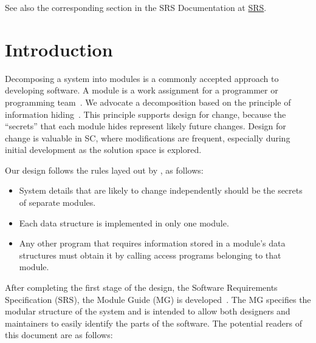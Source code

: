 \documentclass[12pt, titlepage]{article}
\begin{document}
See also the corresponding section in the SRS Documentation at 
\href{https://github.com/gabrielasd/eomee/tree/cas741/docs/SRS/}{SRS}.\\
\newpage

\tableofcontents

\listoftables

\listoffigures

\newpage


\section{Introduction}

Decomposing a system into modules is a commonly accepted approach to developing
software.  A module is a work assignment for a programmer or programming
team~\citep{ParnasEtAl1984}.  We advocate a decomposition
based on the principle of information hiding~\citep{Parnas1972a}.  This
principle supports design for change, because the ``secrets'' that each module
hides represent likely future changes.  Design for change is valuable in SC,
where modifications are frequent, especially during initial development as the
solution space is explored.  

Our design follows the rules layed out by \citet{ParnasEtAl1984}, as follows:
\begin{itemize}
\item System details that are likely to change independently should be the
  secrets of separate modules.
\item Each data structure is implemented in only one module.
\item Any other program that requires information stored in a module's data
  structures must obtain it by calling access programs belonging to that module.
\end{itemize}

After completing the first stage of the design, the Software Requirements
Specification (SRS), the Module Guide (MG) is developed~\citep{ParnasEtAl1984}. The MG
specifies the modular structure of the system and is intended to allow both
designers and maintainers to easily identify the parts of the software.  The
potential readers of this document are as follows:
\end{document}
